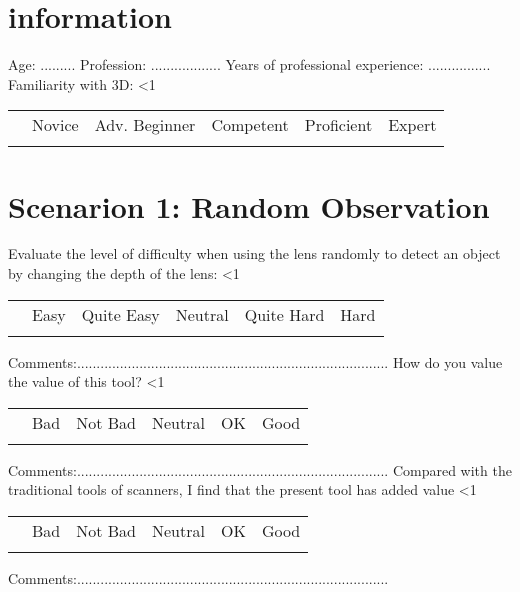 \documentclass[a4paper]{exam}
\makeatletter
\newcounter{mquestion}
\newcounter{row}
\newcommand\addtabtoks[1]{\@tabtoks\expandafter{\the\@tabtoks#1}}
\newcommand*\resettabtoks{\@tabtoks{}}
\newcommand*\printtabtoks{\the\@tabtoks}
\newcommand\CheckTable[1]{%
  \setcounter{mquestion}{0}
  \setcounter{row}{0}
  \resettabtoks
  \loop\ifnum\therow<#1\relax
    \stepcounter{row}
    \addtabtoks{& $\square$ & $\square$ & $\square$ & $\square$ & $\square$ \\}%
  \repeat
  \begin{longtable}{>{\stepcounter{mquestion}}l*{5}{c}}
    \multicolumn{1}{c}{} & Bad & Not Bad & Neutral & OK & Good \\
    \printtabtoks
  \end{longtable}%
}
\newcommand\CheckTablelevel[1]{%
  \setcounter{mquestion}{0}
  \setcounter{row}{0}
  \resettabtoks
  \loop\ifnum\therow<#1\relax
    \stepcounter{row}
    \addtabtoks{& $\square$ & $\square$ & $\square$ & $\square$ & $\square$ \\}%
  \repeat
  \begin{longtable}{>{\stepcounter{mquestion}}l*{5}{c}}
    \multicolumn{1}{c}{} & Novice &  Adv. Beginner &  Competent & Proficient  & Expert \\
    \printtabtoks
  \end{longtable}%
}
\newcommand\CheckTableDifficulty[1]{%
  \setcounter{mquestion}{0}
  \setcounter{row}{0}
  \resettabtoks
  \loop\ifnum\therow<#1\relax
    \stepcounter{row}
    \addtabtoks{& $\square$ & $\square$ & $\square$ & $\square$ & $\square$ \\}%
  \repeat
  \begin{longtable}{>{\stepcounter{mquestion}}l*{5}{c}}
    \multicolumn{1}{c}{} & Easy & Quite Easy & Neutral & Quite Hard & Hard \\
    \printtabtoks
  \end{longtable}%
}
\makeatother
\begin{document}
\section{information}

 Age: ......... \newline
 Profession: .................. \newline
 Years of professional experience: ................ \newline
 Familiarity with 3D: 
\CheckTablelevel{1}

\section{Scenarion 1: Random Observation }
Evaluate the level of difficulty when using the lens randomly to detect an object by changing the depth of the lens:
\CheckTableDifficulty{1}
Comments:................................................................................ \newline \newline
How do you value the value of this tool?
\CheckTable{1}
Comments:................................................................................ \newline \newline
Compared with the traditional tools of scanners, I find that the present tool has added value
\CheckTable{1}
Comments:................................................................................ \newline \newline
\end{document}
